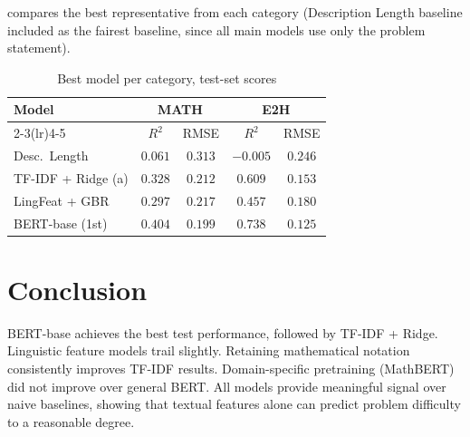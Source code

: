 \documentclass[twocolumn, 10pt]{article}
\begin{document}
 compares the best representative from each category (Description Length baseline included as the fairest baseline, since all main models use only the problem statement).

\begin{table}[ht]
\centering
\caption{Best model per category, test-set scores}
\label{tab:comparison}
\small
\begin{tabular}{lcccc}
\toprule
\multirow{2}{*}{\textbf{Model}} & \multicolumn{2}{c}{\textbf{MATH}} & \multicolumn{2}{c}{\textbf{E2H}} \\
\cmidrule(lr){2-3}\cmidrule(lr){4-5}
& $R^2$ & RMSE & $R^2$ & RMSE \\
\midrule
Desc.\ Length    & $0.061$ & $0.313$ & $-0.005$ & $0.246$ \\
TF-IDF + Ridge (a) & $0.328$ & $0.212$ & $0.609$  & $0.153$ \\
LingFeat + GBR   & $0.297$ & $0.217$ & $0.457$  & $0.180$ \\
BERT-base (1st)  & $0.404$ & $0.199$ & $0.738$  & $0.125$ \\
\bottomrule
\end{tabular}
\end{table}

\section{Conclusion}

BERT-base achieves the best test performance, followed by TF-IDF + Ridge. Linguistic feature models trail slightly. Retaining mathematical notation consistently improves TF-IDF results. Domain-specific pretraining (MathBERT) did not improve over general BERT. All models provide meaningful signal over naive baselines, showing that textual features alone can predict problem difficulty to a reasonable degree.



\end{document}
